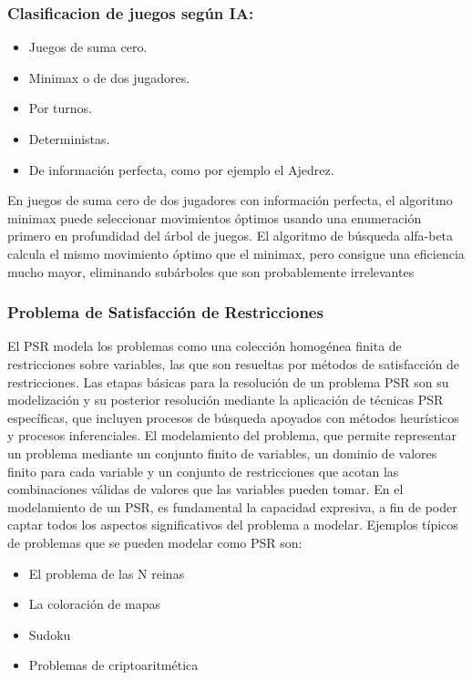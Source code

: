 \documentclass[a4paper]{article}
\begin{document}
\subsubsection*{Clasificacion de juegos seg\'un IA:}
\begin{itemize}
\item Juegos de suma cero.
\item Minimax o de dos jugadores.
\item Por turnos.
\item Deterministas.
\item De información perfecta, como por ejemplo el Ajedrez. 
\end{itemize}

En juegos de suma cero de dos jugadores con información perfecta, el algoritmo minimax puede seleccionar movimientos óptimos usando una enumeración primero en profundidad del árbol de juegos.
El algoritmo de búsqueda alfa-beta calcula el mismo movimiento óptimo que el minimax, pero consigue una eficiencia mucho mayor, eliminando subárboles que son probablemente irrelevantes

\subsubsection{Problema de Satisfacci\'on de Restricciones}
El PSR modela los problemas como una colección homogénea finita de restricciones sobre variables, las que son resueltas por métodos de satisfacción de restricciones. Las etapas básicas para la resolución de un problema PSR son su modelización y su posterior resolución mediante la aplicación de técnicas PSR específicas, que incluyen procesos de búsqueda apoyados con métodos heurísticos y procesos inferenciales. El modelamiento del problema, que permite representar un problema mediante un conjunto finito de variables, un dominio de valores finito para cada variable y un conjunto de restricciones que acotan las combinaciones válidas de valores que las variables pueden tomar. En el modelamiento de un PSR, es fundamental la capacidad expresiva, a fin de poder captar todos los aspectos significativos del problema a modelar.
Ejemplos típicos de problemas que se pueden modelar como PSR 
son:
\begin{itemize}
\item El problema de las N reinas
\item La coloración de mapas 
\item Sudoku 
\item Problemas de criptoaritmética
\end{itemize}
\end{document}
